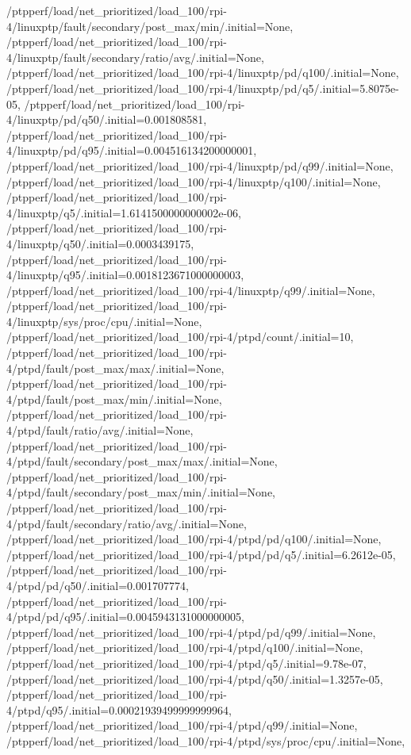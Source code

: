 {    /ptpperf/load/net_prioritized/load_100/rpi-4/linuxptp/fault/secondary/post_max/min/.initial=None,
    /ptpperf/load/net_prioritized/load_100/rpi-4/linuxptp/fault/secondary/ratio/avg/.initial=None,
    /ptpperf/load/net_prioritized/load_100/rpi-4/linuxptp/pd/q100/.initial=None,
    /ptpperf/load/net_prioritized/load_100/rpi-4/linuxptp/pd/q5/.initial=5.8075e-05,
    /ptpperf/load/net_prioritized/load_100/rpi-4/linuxptp/pd/q50/.initial=0.001808581,
    /ptpperf/load/net_prioritized/load_100/rpi-4/linuxptp/pd/q95/.initial=0.004516134200000001,
    /ptpperf/load/net_prioritized/load_100/rpi-4/linuxptp/pd/q99/.initial=None,
    /ptpperf/load/net_prioritized/load_100/rpi-4/linuxptp/q100/.initial=None,
    /ptpperf/load/net_prioritized/load_100/rpi-4/linuxptp/q5/.initial=1.6141500000000002e-06,
    /ptpperf/load/net_prioritized/load_100/rpi-4/linuxptp/q50/.initial=0.0003439175,
    /ptpperf/load/net_prioritized/load_100/rpi-4/linuxptp/q95/.initial=0.0018123671000000003,
    /ptpperf/load/net_prioritized/load_100/rpi-4/linuxptp/q99/.initial=None,
    /ptpperf/load/net_prioritized/load_100/rpi-4/linuxptp/sys/proc/cpu/.initial=None,
    /ptpperf/load/net_prioritized/load_100/rpi-4/ptpd/count/.initial=10,
    /ptpperf/load/net_prioritized/load_100/rpi-4/ptpd/fault/post_max/max/.initial=None,
    /ptpperf/load/net_prioritized/load_100/rpi-4/ptpd/fault/post_max/min/.initial=None,
    /ptpperf/load/net_prioritized/load_100/rpi-4/ptpd/fault/ratio/avg/.initial=None,
    /ptpperf/load/net_prioritized/load_100/rpi-4/ptpd/fault/secondary/post_max/max/.initial=None,
    /ptpperf/load/net_prioritized/load_100/rpi-4/ptpd/fault/secondary/post_max/min/.initial=None,
    /ptpperf/load/net_prioritized/load_100/rpi-4/ptpd/fault/secondary/ratio/avg/.initial=None,
    /ptpperf/load/net_prioritized/load_100/rpi-4/ptpd/pd/q100/.initial=None,
    /ptpperf/load/net_prioritized/load_100/rpi-4/ptpd/pd/q5/.initial=6.2612e-05,
    /ptpperf/load/net_prioritized/load_100/rpi-4/ptpd/pd/q50/.initial=0.001707774,
    /ptpperf/load/net_prioritized/load_100/rpi-4/ptpd/pd/q95/.initial=0.0045943131000000005,
    /ptpperf/load/net_prioritized/load_100/rpi-4/ptpd/pd/q99/.initial=None,
    /ptpperf/load/net_prioritized/load_100/rpi-4/ptpd/q100/.initial=None,
    /ptpperf/load/net_prioritized/load_100/rpi-4/ptpd/q5/.initial=9.78e-07,
    /ptpperf/load/net_prioritized/load_100/rpi-4/ptpd/q50/.initial=1.3257e-05,
    /ptpperf/load/net_prioritized/load_100/rpi-4/ptpd/q95/.initial=0.00021939499999999964,
    /ptpperf/load/net_prioritized/load_100/rpi-4/ptpd/q99/.initial=None,
    /ptpperf/load/net_prioritized/load_100/rpi-4/ptpd/sys/proc/cpu/.initial=None,
}
